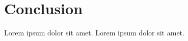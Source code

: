 \documentclass[main.tex]{subfiles}
\begin{document}
\section{Conclusion}

Lorem ipsum dolor sit amet. Lorem ipsum dolor sit amet.
\end{document}
